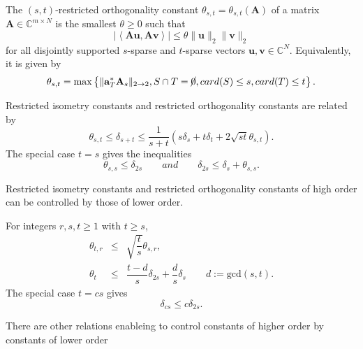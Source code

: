\begin{definition}
    \label{def2.4}
    The $(s,t)$-restricted orthogonality constant $\theta_{s,t} = \theta_{s,t}(\mathbf{A})$ of a matrix $\mathbf{A} \in \mathbb{C}^{m \times N}$ is the smallest $\theta \geq 0$ such that
    \begin{equation}
        \label{eq2.4}
        \left|\left<\mathbf{Au}, \mathbf{Av}\right>\right| \leq \theta \|\mathbf{u}\|_2 \|\mathbf{v}\|_2
    \end{equation}
    for all disjointly supported $s$-sparse and $t$-sparse vectors $\mathbf{u,v} \in \mathbb{C}^N$. Equivalently, it is given by 
    \begin{equation}
        \label{eq2.5}
        \theta_{s,t} = \max\left\{\|\mathbf{a}_T^*\mathbf{A}_s\|_{2 \rightarrow 2}, S \cap T = \cancel{0}, card(S) \leq s, card(T) \leq t\right\}.
    \end{equation}
\end{definition}

\begin{proposition}
    \label{pr2.5}
    Restricted isometry constants and restricted orthogonality constants are related by
    \begin{equation*}
        \theta_{s,t} \leq \delta_{s+t} \leq \dfrac{1}{s+t}(s\delta_s + t\delta_t +2 \sqrt{st}\theta_{s,t}).
    \end{equation*}
    The special case $t=s$ gives the inequalities
    \begin{equation*}
        \theta_{s,s} \leq \delta_{2s} \qquad and \qquad \delta_{2s} \leq \delta_s + \theta_{s,s}.
    \end{equation*}
\end{proposition}

Restricted isometry constants and restricted orthogonality constants of high order can be controlled by those of lower order.
\begin{proposition}
    \label{pr2.6}
    For integers $r,s,t \geq 1$ with $t \geq s$,
    \begin{eqnarray*}
        \theta_{t,r} &\leq& \sqrt{\dfrac{t}{s}}\theta_{s,r}, \\
    \theta_t &\leq& \dfrac{t-d}{s}\delta_{2s} + \dfrac{d}{s} \delta_s \qquad d:= \text{gcd}(s,t).
    \end{eqnarray*}
    The special case $t= cs$ gives 
    \[
        \delta_{cs} \leq c \delta_{2s}.
    \]
\end{proposition}

\begin{remark}
    \label{rmk2.7}
    There are other relations enableing to control constants of higher order by constants of lower order
\end{remark}

